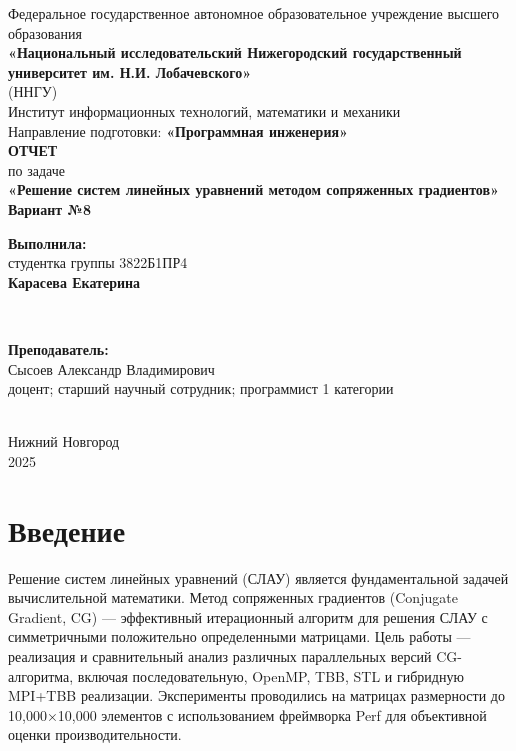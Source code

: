 \documentclass[12pt]{article}
\begin{document}
\begin{titlepage}
    \centering
    \large
    Федеральное государственное автономное образовательное учреждение высшего образования\\[0.5cm]
    \textbf{«Национальный исследовательский Нижегородский государственный университет им. Н.И. Лобачевского»}\\
    (ННГУ)\\[1cm]
    Институт информационных технологий, математики и механики\\[0.5cm]
    Направление подготовки: \textbf{«Программная инженерия»}\\[2cm]

    \vfill
    {\LARGE \textbf{ОТЧЕТ}}\\[0.5cm]
    {\Large по задаче}\\[0.5cm]
    {\LARGE \textbf{«Решение систем линейных уравнений методом сопряженных градиентов»}}\\[0.5cm]
    {\Large \textbf{Вариант №8}}\\[2.5cm]

    \hfill\parbox{0.5\textwidth}{
        \textbf{Выполнила:} \\
        студентка группы 3822Б1ПР4 \\
        \textbf{Карасева Екатерина}
    }\\[0.5cm]

    \hfill\parbox{0.5\textwidth}{
        \textbf{Преподаватель:} \\
        Сысоев Александр Владимирович \\
        доцент; старший научный сотрудник; программист 1 категории \\
    }\\[2cm]

    Нижний Новгород\\
    2025
\end{titlepage}

\tableofcontents
\newpage

\section*{Введение}

Решение систем линейных уравнений (СЛАУ) является фундаментальной задачей вычислительной математики. Метод сопряженных градиентов (Conjugate Gradient, CG) — эффективный итерационный алгоритм для решения СЛАУ с симметричными положительно определенными матрицами. Цель работы — реализация и сравнительный анализ различных параллельных версий CG-алгоритма, включая последовательную, OpenMP, TBB, STL и гибридную MPI+TBB реализации. Эксперименты проводились на матрицах размерности до 10,000×10,000 элементов с использованием фреймворка Perf для объективной оценки производительности.
\end{document}
